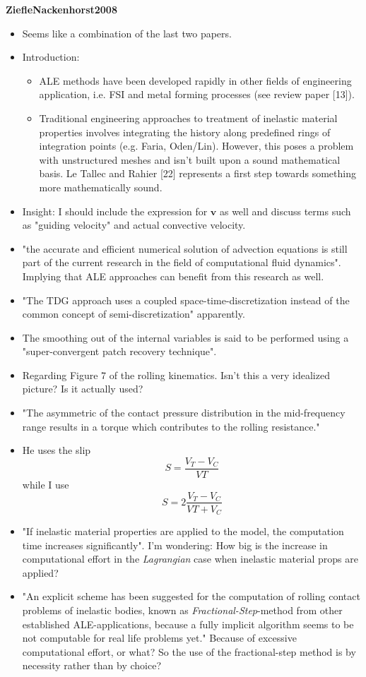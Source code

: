 \documentclass{article}
\begin{document}
\textbf{ZiefleNackenhorst2008}
\begin{itemize}
\item Seems like a combination of the last two papers.
\item Introduction:
\begin{itemize}
\item ALE methods have been developed rapidly in other fields of engineering application, i.e. FSI and metal forming processes (see review paper [13]).
\item Traditional engineering approaches to treatment of inelastic material properties involves integrating the history along predefined rings of integration points (e.g. Faria, Oden/Lin). However, this poses a problem with unstructured meshes and isn't built upon a sound mathematical basis. Le Tallec and Rahier [22] represents a first step towards something more mathematically sound.
\end{itemize}
\item Insight: I should include the expression for $\boldsymbol{v}$ as well and discuss terms such as "guiding velocity" and actual convective velocity.
\item "the accurate and efficient numerical solution of advection equations is still part of the current research in the field of computational fluid dynamics". Implying that ALE approaches can benefit from this research as well.
\item "The TDG approach uses a coupled space-time-discretization instead of the common concept of semi-discretization" apparently.
\item The smoothing out of the internal variables is said to be performed using a "super-convergent patch recovery technique".
\item Regarding Figure 7 of the rolling kinematics. Isn't this a very idealized picture? Is it actually used?
\item "The asymmetric of the contact pressure distribution in the mid-frequency range results in a torque which contributes to the rolling resistance."
\item He uses the slip
\[S = \frac{V_T-V_C}{VT}\]
while I use
\[S = 2\frac{V_T-V_C}{VT+V_C}\]
\item "If inelastic material properties are applied to the model, the computation time increases significantly". I'm wondering: How big is the increase in computational effort in the \emph{Lagrangian} case when inelastic material props are applied?
\item "An explicit scheme has been suggested for the computation of rolling contact problems of inelastic bodies, known as \emph{Fractional-Step}-method from other established ALE-applications, because a fully implicit algorithm seems to be not computable for real life problems yet." Because of excessive computational effort, or what? So the use of the fractional-step method is by necessity rather than by choice?

\end{itemize}
\end{document}
